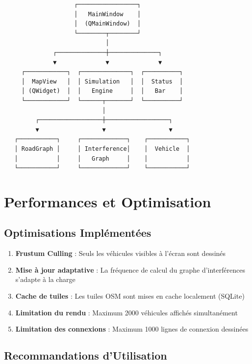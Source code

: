 \documentclass[12pt,a4paper]{article}
\begin{document}
\begin{verbatim}
                    ┌─────────────────┐
                    │   MainWindow    │
                    │  (QMainWindow)  │
                    └────────┬────────┘
                             │
              ┌──────────────┼──────────────┐
              ▼              ▼              ▼
     ┌────────────┐  ┌──────────────┐  ┌──────────┐
     │  MapView   │  │ Simulation   │  │  Status  │
     │ (QWidget)  │  │   Engine     │  │   Bar    │
     └────────────┘  └──────┬───────┘  └──────────┘
                            │
         ┌──────────────────┼──────────────────┐
         ▼                  ▼                  ▼
   ┌───────────┐     ┌─────────────┐    ┌───────────┐
   │ RoadGraph │     │ Interference│    │  Vehicle  │
   │           │     │   Graph     │    │           │
   └───────────┘     └─────────────┘    └───────────┘
\end{verbatim}

\section{Performances et Optimisation}

\subsection{Optimisations Implémentées}

\begin{enumerate}
    \item \textbf{Frustum Culling} : Seuls les véhicules visibles à l'écran sont dessinés
    \item \textbf{Mise à jour adaptative} : La fréquence de calcul du graphe d'interférences s'adapte à la charge
    \item \textbf{Cache de tuiles} : Les tuiles OSM sont mises en cache localement (SQLite)
    \item \textbf{Limitation du rendu} : Maximum 2000 véhicules affichés simultanément
    \item \textbf{Limitation des connexions} : Maximum 1000 lignes de connexion dessinées
\end{enumerate}

\subsection{Recommandations d'Utilisation}
\end{document}
